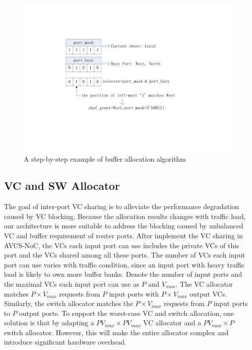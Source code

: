 \documentclass[10pt,conference]{IEEEtran}
\begin{document}
\begin{figure}
\centering\includegraphics[scale=0.5]{figures/Algorithm.pdf}
\caption{A step-by-step example of buffer allocation algorithm}\label{Algorithm}
\end{figure}

\subsection{VC and SW Allocator}\label{allocmux}
The goal of inter-port VC sharing is to alleviate the performance degradation caused by VC blocking. Because the allocation results changes with traffic load, our architecture is more suitable to address the blocking caused by unbalanced VC and buffer requirement of router ports. After implement the VC sharing in AVCS-NoC, the VCs each input port can use includes the private VCs of this port and the VCs shared among all these ports. The number of VCs each input port can use varies with traffic condition, since an input port with heavy traffic load is likely to own more buffer banks. Denote the number of input ports and the maximal VCs each input port can use as $P$ and $V_{max}$. The VC allocator matches $P\times V_{max}$ requests from $P$ input ports with $P\times V_{max}$ output VCs. Similarly, the switch allocator matches the $P\times V_{max}$ requests from $P$ input ports to $P$ output ports. To support the worst-case VC and switch allocation, one solution is that by adapting a $PV_{max}\times PV_{max}$ VC allocator and a $PV_{max}\times P$ switch allocator. However, this will make the entire allocator complex and introduce significant hardware overhead.

\end{document}
